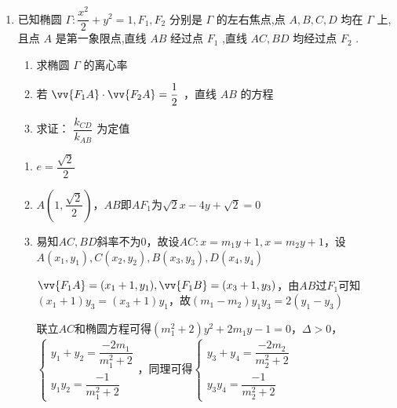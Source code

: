 \begin{enumerate}
\begin{enumerate}
\begin{jieda}
\begin{enumerate}
                设 $M\left( {{x}_{1},{y}_{1}}\right) ,N\left( {{x}_{2},{y}_{2}}\right)$ ,
                则 ${S}_{1} + {S}_{2} = \dfrac{1}{2} \times  \left| {AB}\right|  \times  \left| {{y}_{1} - {y}_{2}}\right|  = 5\left| {{y}_{1} - {y}_{2}}\right| = \dfrac{{450}\sqrt{{t}^{2} + 1}}{9{t}^{2} + {25}}$.

                令 $\sqrt{{t}^{2} + 1} = m$ ,则 ${S}_{1} + {S}_{2} = \dfrac{450m}{9{m}^{2} + {16}} \leq  \dfrac{450m}{2\sqrt{9{m}^{2} \cdot  {16}}} = \dfrac{450}{2 \times  3 \times  4} = \dfrac{75}{4}$
                
                故 $m = \dfrac{4}{3}$ 时, ${S}_{1} + {S}_{2}$ 取得最大值为 $\dfrac{75}{4}$ .
            \end{enumerate}
        \end{jieda}


        \item 已知椭圆 $ \Gamma  : \dfrac{{x}^{2}}{2} + {y}^{2} = 1,{F}_{1},{F}_{2} $ 分别是 $ \Gamma $ 的左右焦点,点 $ A,B,C,D $ 均在 $ \Gamma $ 上,且点 $ A $ 是第一象限点,直线 $ {AB} $ 经过点 $ {F}_{1} $ ,直线 $ {AC},{BD} $ 均经过点 $ {F}_{2} $ .
        \begin{enumerate}
            \item 求椭圆 $ \Gamma $ 的离心率
            \item 若 $ \vv{F_{1}A} \cdot  \vv{F_{2}A} = \dfrac{1}{2} $ ，直线 $ {AB} $ 的方程
            \item 求证： $ \dfrac{{k}_{CD}}{{k}_{AB}} $ 为定值
        \end{enumerate}
        \begin{jieda}
            \begin{enumerate}
                \item $e = \dfrac{\sqrt{2}}{2}$
                \item $A\left(1, \dfrac{\sqrt{2}}{2}\right)$，$AB$即$AF_1$为$\sqrt{2}x-4y+\sqrt{2} = 0$
                \item 易知$AC, BD$斜率不为0，故设$AC: x = m_1y + 1, x = m_2y+1$，设$A(x_1, y_1), C(x_2, y_2), B(x_3, y_3), D(x_4, y_4)$
                
                $\vv{F_1A} = (x_1+1, y_1), \vv{F_1B} = (x_3+1, y_3)$，由$AB$过$F_1$可知$(x_1+1)y_3 = (x_3+1)y_1$，故$(m_1-m_2)y_1y_3 = 2(y_1-y_3)$

                联立$AC$和椭圆方程可得$(m_1^2+2)y^2+2m_1y-1 = 0$，$\Delta > 0$，$\left\{\begin{array}{l}
                    y_1+y_2 = \dfrac{-2m_1}{m_1^2+2} \\
                    y_1y_2 = \dfrac{-1}{m_1^2+2}
                \end{array}\right.$，同理可得$\left\{\begin{array}{l}
                    y_3+y_4 = \dfrac{-2m_2}{m_2^2+2} \\
                    y_3y_4 = \dfrac{-1}{m_2^2+2}
                \end{array}\right.$


\end{enumerate}
\end{jieda}
\end{enumerate}
\end{enumerate}
